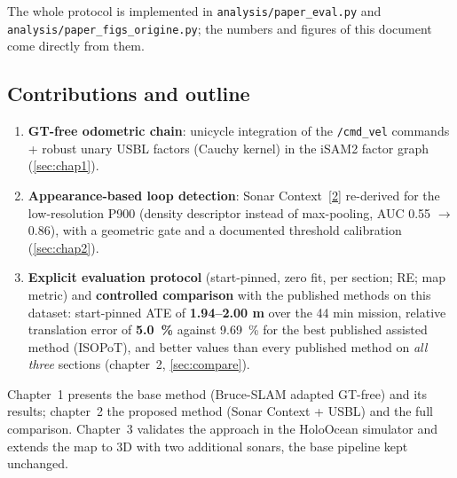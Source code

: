 The whole protocol is implemented in \texttt{analysis/paper\_eval.py} and
\texttt{analysis/paper\_figs\_origine.py}; the numbers and figures of this document
come directly from them.

\subsection{Contributions and outline}

\begin{enumerate}
\item \textbf{GT-free odometric chain}: unicycle integration of the \texttt{/cmd\_vel}
  commands + robust unary USBL factors (Cauchy kernel) in the iSAM2 factor graph
  (\autoref{sec:chap1}).
\item \textbf{Appearance-based loop detection}: Sonar Context~\hyperref[bib:sonarcontext]{[2]} re-derived for the
  low-resolution P900 (density descriptor instead of max-pooling,
  AUC 0.55 $\to$ 0.86), with a geometric gate and a documented threshold calibration
  (\autoref{sec:chap2}).
\item \textbf{Explicit evaluation protocol} (start-pinned, zero fit, per section;
  RE; map metric) and \textbf{controlled comparison} with the published methods on
  this dataset: start-pinned ATE of \textbf{1.94--2.00 m} over the 44 min mission,
  relative translation error of \textbf{5.0~\%} against 9.69~\% for the best
  published assisted method (ISOPoT), and better values than every published method
  on \emph{all three} sections (chapter~2, \autoref{sec:compare}).
\end{enumerate}

Chapter~1 presents the base method (Bruce-SLAM adapted GT-free) and its results;
chapter~2 the proposed method (Sonar Context + USBL) and the full comparison.
Chapter~3 validates the approach in the HoloOcean simulator and extends the map
to 3D with two additional sonars, the base pipeline kept unchanged.
